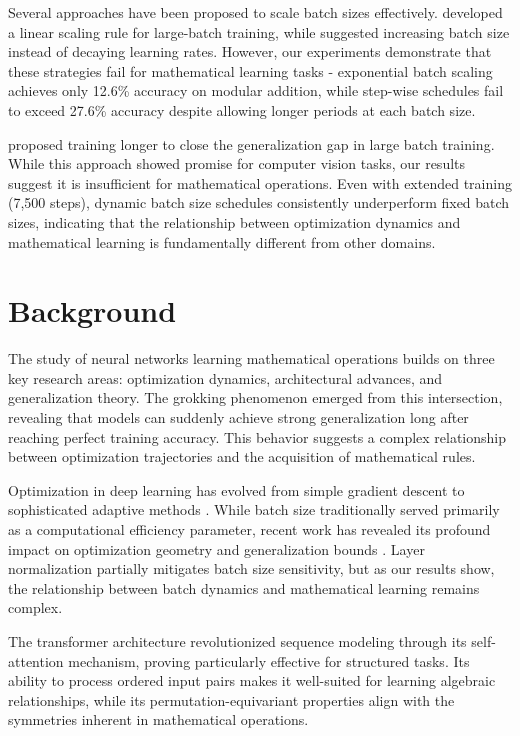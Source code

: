 \documentclass{article} %
\begin{document}
Several approaches have been proposed to scale batch sizes effectively. \citet{Goyal2017AccurateLM} developed a linear scaling rule for large-batch training, while \citet{Smith2017DontDT} suggested increasing batch size instead of decaying learning rates. However, our experiments demonstrate that these strategies fail for mathematical learning tasks - exponential batch scaling achieves only 12.6\% accuracy on modular addition, while step-wise schedules fail to exceed 27.6\% accuracy despite allowing longer periods at each batch size.

\citet{Hoffer2017TrainLG} proposed training longer to close the generalization gap in large batch training. While this approach showed promise for computer vision tasks, our results suggest it is insufficient for mathematical operations. Even with extended training (7,500 steps), dynamic batch size schedules consistently underperform fixed batch sizes, indicating that the relationship between optimization dynamics and mathematical learning is fundamentally different from other domains.

\section{Background}
\label{sec:background}

The study of neural networks learning mathematical operations builds on three key research areas: optimization dynamics, architectural advances, and generalization theory. The grokking phenomenon \citep{power2022grokking} emerged from this intersection, revealing that models can suddenly achieve strong generalization long after reaching perfect training accuracy. This behavior suggests a complex relationship between optimization trajectories and the acquisition of mathematical rules.

Optimization in deep learning has evolved from simple gradient descent to sophisticated adaptive methods \citep{kingma2014adam}. While batch size traditionally served primarily as a computational efficiency parameter, recent work has revealed its profound impact on optimization geometry and generalization bounds \citep{Keskar2016OnLT}. Layer normalization \citep{ba2016layer} partially mitigates batch size sensitivity, but as our results show, the relationship between batch dynamics and mathematical learning remains complex.

The transformer architecture \citep{vaswani2017attention} revolutionized sequence modeling through its self-attention mechanism, proving particularly effective for structured tasks. Its ability to process ordered input pairs makes it well-suited for learning algebraic relationships, while its permutation-equivariant properties align with the symmetries inherent in mathematical operations.
\end{document}

